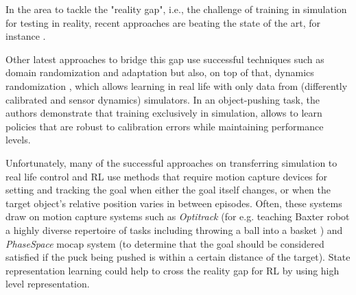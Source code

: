 \documentclass[a4paper]{article}
\newcommand{\tim}[1]{\todo[color=yellow!60,inline]{#1}}
\begin{document}
\begin{itemize}

\end{itemize}


In the area to tackle the "reality gap", i.e., the challenge of training in simulation for testing in reality, recent approaches are beating the state of the art, for instance \cite{Peng17}.%


Other latest approaches to bridge this gap use successful techniques such as domain randomization \cite{Tobin17} and adaptation \cite{Bousmalis17} but also, on top of that, dynamics randomization \cite{Peng17}, which allows learning in real life with only data from (differently calibrated and sensor dynamics) simulators. In an object-pushing task, the authors demonstrate that training exclusively in simulation, allows to learn policies that are robust to calibration errors while maintaining performance levels.

Unfortunately, many of the successful approaches on transferring simulation to real life control and RL use methods that require motion capture devices for setting and tracking the goal when either the goal itself changes, or when the target object's relative position varies in between episodes. Often, these systems draw on motion capture systems such as \textit{Optitrack} (for e.g. teaching Baxter robot a highly diverse repertoire of tasks including throwing a ball into a basket \cite{Kim17}) and \textit{PhaseSpace} mocap system \cite{Peng17} (to determine that the goal should be considered satisfied if the puck being pushed is within a certain distance of the target). State representation learning could help to cross the reality gap for RL by using high level representation.
\end{document}
